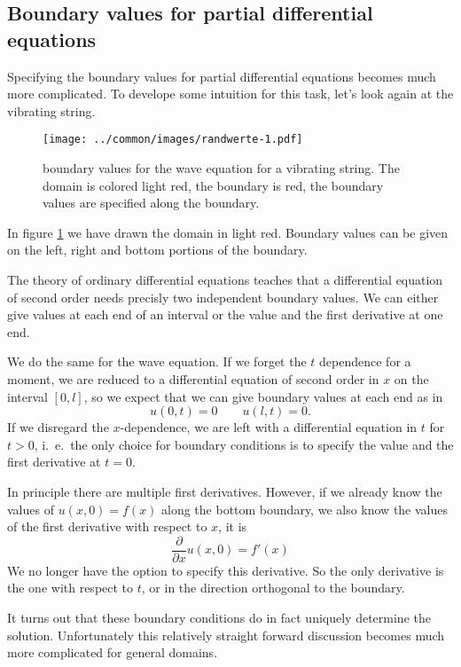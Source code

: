\subsection{Boundary values for partial differential equations\label{klassifikation:randwerte-pde}}
Specifying the boundary values for partial differential equations
becomes much more complicated.
To develope some intuition for this task, let's look again at the
vibrating string.
\begin{figure}
\begin{center}
\texttt{[image: ../common/images/randwerte-1.pdf]}
\end{center}
\caption{boundary values for the wave equation for a vibrating string.
The domain is colored light red, the boundary is red, the boundary
values are specified along the boundary.
\label{klassifikation:randwertesaite}}
\end{figure}
In figure \ref{klassifikation:randwertesaite}
we have drawn the domain in light red.
Boundary values can be given on the left, right and bottom portions
of the boundary.

The theory of ordinary differential equations teaches that a 
differential equation of second order needs precisly two independent
boundary values.
We can either give values at each end of an interval or the value and the
first derivative at one end.

We do the same for the wave equation.
If we forget the $t$ dependence for a moment, we are reduced to a
differential equation of second order in $x$ on the interval $[0,l]$,
so we expect that we can give boundary values at each end
as in
\[
u(0,t)=0\qquad u(l,t)=0.
\]
If we disregard the $x$-dependence, we are left with a differential equation
in $t$ for $t>0$, i.~e.~the only choice for boundary conditions is to
specify the value and the first derivative at $t=0$.

In principle there are multiple first derivatives.
However, if we already know the values of $u(x,0)=f(x)$ along the bottom
boundary, we
also know the values of the first derivative with respect to $x$, it is
\[
\frac{\partial }{\partial x}u(x,0) = f'(x)
\]
We no longer have the option to specify this derivative.
So the only derivative is the one with respect to $t$, or in the direction
orthogonal to the boundary.

It turns out that these boundary conditions do in fact uniquely
determine the solution.
Unfortunately this relatively straight forward discussion becomes
much more complicated for general domains.

